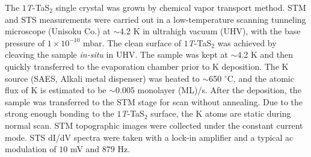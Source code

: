 \documentclass[aps,prl,reprint,groupedaddress,showpacs,amsfonts,amsmath,amssymb,superscriptaddress]{revtex4-1}
\begin{document}
The $1$\emph{T}-TaS$_{2}$ single crystal was grown by chemical vapor transport method. STM and STS measurements were carried out in a low-temperature scanning tunneling microscope (Unisoku Co.) at $\sim$4.2 K in ultrahigh vacuum (UHV), with the base pressure of $1\times10^{-10}$ mbar. The clean surface of $1$\emph{T}-TaS$_{2}$ was achieved by cleaving the sample \emph{in-situ} in UHV. The sample was kept at $\sim$4.2 K and then quickly transferred to the evaporation chamber prior to K deposition. The K source (SAES, Alkali metal dispenser) was heated to $\sim$650 $^{\circ}$C, and the atomic flux of K is estimated to be $\sim$0.005 monolayer (ML)/s. After the deposition, the sample was transferred to the STM stage for scan without annealing. Due to the strong enough bonding to the $1$\emph{T}-TaS$_{2}$ surface, the K atoms are static during normal scan. STM topographic images were collected under the constant current mode. STS dI/dV spectra were taken with a lock-in amplifier and a typical ac modulation of $10$ mV and $879$ Hz.
\end{document}
